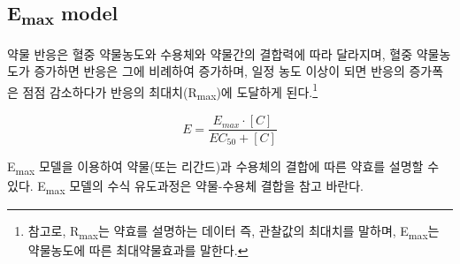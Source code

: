 \documentclass[
  11pt,
  krantz2,
  a4paper]{krantz}
\theoremstyle{definition}
\theoremstyle{definition}
\theoremstyle{definition}
\theoremstyle{remark}
\begin{document}
\hypertarget{emax-model}{%
\subsection{\texorpdfstring{E\textsubscript{max} model}{Emax model}}\label{emax-model}}

약물 반응은 혈중 약물농도와 수용체와 약물간의 결합력에 따라 달라지며, 혈중 약물농도가 증가하면 반응은 그에 비례하여 증가하며, 일정 농도 이상이 되면 반응의 증가폭은 점점 감소하다가 반응의 최대치(R\textsubscript{max})에 도달하게 된다.\footnote{참고로, R\textsubscript{max}는 약효를 설명하는 데이터 즉, 관찰값의 최대치를 말하며, E\textsubscript{max}는 약물농도에 따른 최대약물효과를 말한다.}

\begin{equation}
E = \frac{E_{max} \cdot [C]}{EC_{50} + [C]}
\label{eq:emax-model}
\end{equation}

E\textsubscript{max} 모델을 이용하여 약물(또는 리간드)과 수용체의 결합에 따른 약효를 설명할 수 있다. E\textsubscript{max} 모델의 수식 유도과정은 약물-수용체 결합을 참고 바란다.
\end{document}
